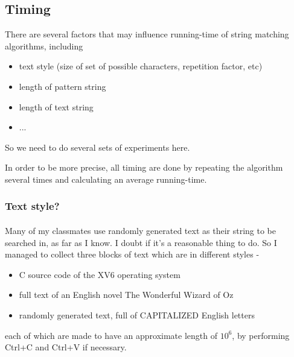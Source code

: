 \begin{homeworkProblem}
{\subsection{Timing}
There are several factors that may influence running-time of string matching algorithms, including
\begin{itemize}
\item text style (size of set of possible characters, repetition factor, etc)
\item length of pattern string
\item length of text string
\item ...
\end{itemize}

So we need to do several sets of experiments here.

In order to be more precise, all timing are done by repeating the algorithm several times and calculating an average running-time.
\subsubsection{Text style?}
\paragraph{} Many of my classmates use randomly generated text as their string to be searched in, as far as I know. I doubt if it's a reasonable thing to do. So I managed to collect three blocks of text which are in different styles -

\begin{itemize}
\item C source code of the XV6 operating system
\item full text of an English novel The Wonderful Wizard of Oz
\item randomly generated text, full of CAPITALIZED English letters
\end{itemize}
each of which are made to have an approximate length of $10^6$, by performing Ctrl+C and Ctrl+V if necessary.

}
\end{homeworkProblem}
